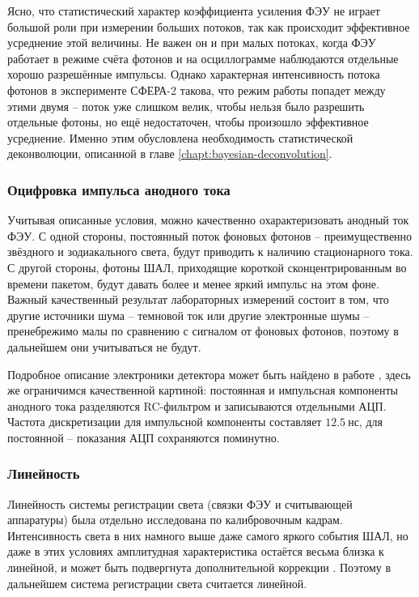 \documentclass[12pt]{book}
\begin{document}
	Ясно, что статистический характер коэффициента усиления ФЭУ не играет большой роли при измерении больших потоков, так как происходит эффективное усреднение этой величины. Не важен он и при малых потоках, когда ФЭУ работает в режиме счёта фотонов и на осциллограмме наблюдаются отдельные хорошо разрешённые импульсы. Однако характерная интенсивность потока фотонов в эксперименте СФЕРА-2 такова, что режим работы попадет между этими двумя -- поток уже слишком велик, чтобы нельзя было разрешить отдельные фотоны, но ещё недостаточен, чтобы произошло эффективное усреднение. Именно этим обусловлена необходимость статистической деконволюции, описанной в главе \ref{chapt:bayesian-deconvolution}.

	\subsubsection{Оцифровка импульса анодного тока}

	Учитывая описанные условия, можно качественно охарактеризовать анодный ток ФЭУ. С одной стороны, постоянный поток фоновых фотонов -- преимущественно звёздного и зодиакального света, будут приводить к наличию стационарного тока. С другой стороны, фотоны ШАЛ, приходящие короткой сконцентрированным во времени пакетом, будут давать более и менее яркий импульс на этом фоне. Важный качественный результат лабораторных измерений состоит в том, что другие источники шума -- темновой ток или другие электронные шумы -- пренебрежимо малы по сравнению с сигналом от фоновых фотонов, поэтому в дальнейшем они учитываться не будут.
	
	Подробное описание электроники детектора может быть найдено в работе \cite{SphereDetector2020}, здесь же ограничимся качественной картиной: постоянная и импульсная компоненты анодного тока разделяются RC-фильтром и записываются отдельными АЦП. Частота дискретизации для импульсной компоненты составляет $12.5~\text{нс}$, для постоянной -- показания АЦП сохраняются поминутно.
	
	\subsubsection{Линейность}
	
	Линейность системы регистрации света (связки ФЭУ и считывающей аппаратуры) была отдельно исследована по калибровочным кадрам. Интенсивность света в них намного выше даже самого яркого события ШАЛ, но даже в этих условиях амплитудная характеристика остаётся весьма близка к линейной, и может быть подвергнута дополнительной коррекции \cite[рис. 6]{SphereCalibration2016}. Поэтому в дальнейшем система регистрации света считается линейной.
\end{document}
